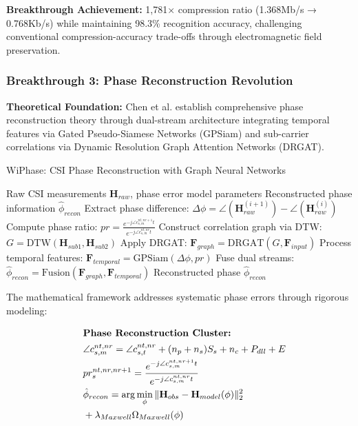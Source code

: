 \documentclass[journal]{IEEEtran}
\begin{document}
\textbf{Breakthrough Achievement:} 1,781× compression ratio (1.368Mb/s → 0.768Kb/s) while maintaining 98.3\% recognition accuracy, challenging conventional compression-accuracy trade-offs through electromagnetic field preservation.

\subsubsection{Breakthrough 3: Phase Reconstruction Revolution}

\textbf{Theoretical Foundation:} Chen et al. \cite{chen2024wiphase} establish comprehensive phase reconstruction theory through dual-stream architecture integrating temporal features via Gated Pseudo-Siamese Networks (GPSiam) and sub-carrier correlations via Dynamic Resolution Graph Attention Networks (DRGAT).

\begin{algorithm}[h]
\caption{WiPhase: CSI Phase Reconstruction with Graph Neural Networks}
\label{alg:wiphase_reconstruction}
\begin{algorithmic}[1]
\REQUIRE Raw CSI measurements $\mathbf{H}_{raw}$, phase error model parameters
\ENSURE Reconstructed phase information $\hat{\phi}_{recon}$
\STATE Extract phase difference: $\Delta\phi = \angle(\mathbf{H}_{raw}^{(i+1)}) - \angle(\mathbf{H}_{raw}^{(i)})$
\STATE Compute phase ratio: $pr = \frac{e^{-j\angle c_{s,m}^{nt,nr+1} t}}{e^{-j\angle c_{s,m}^{nt,nr} t}}$
\STATE Construct correlation graph via DTW: $G = \text{DTW}(\mathbf{H}_{sub1}, \mathbf{H}_{sub2})$
\STATE Apply DRGAT: $\mathbf{F}_{graph} = \text{DRGAT}(G, \mathbf{F}_{input})$
\STATE Process temporal features: $\mathbf{F}_{temporal} = \text{GPSiam}(\Delta\phi, pr)$
\STATE Fuse dual streams: $\hat{\phi}_{recon} = \text{Fusion}(\mathbf{F}_{graph}, \mathbf{F}_{temporal})$
\RETURN Reconstructed phase $\hat{\phi}_{recon}$
\end{algorithmic}
\end{algorithm}

The mathematical framework addresses systematic phase errors through rigorous modeling:

\begin{align}
&\hspace{2em} \text{\textbf{Phase Reconstruction Cluster:}} \quad &  \nonumber \\
&\hspace{2em} \angle c_{s,m}^{nt,nr} = \angle c_{s,t}^{nt,nr} + (n_p + n_s)S_s + n_c + P_{dll} + E \label{eq:phase_error_model_v4} \\
&\hspace{2em} pr_s^{nt,nr,nr+1} = \frac{e^{-j\angle c_{s,m}^{nt,nr+1} t}}{e^{-j\angle c_{s,m}^{nt,nr} t}} \label{eq:phase_ratio_v4} \\
&\hspace{2em} \hat{\phi}_{recon} = \arg\min_{\phi} \|\mathbf{H}_{obs} - \mathbf{H}_{model}(\phi)\|_2^2 \nonumber \\
&\hspace{2em} + \lambda_{Maxwell} \Omega_{Maxwell}(\phi) \label{eq:phase_optimization_v4}
\end{align}
\end{document}
